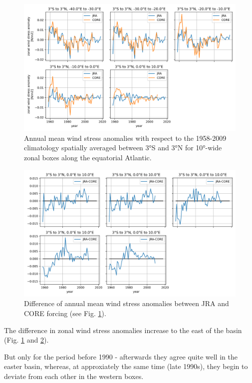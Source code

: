 \documentclass[a4paperpaper,]{article}
\begin{document}
\begin{figure}
\centering
\includegraphics{./figures/INALT20_wind_forcing_comparison/INALT_JRA_CORE_taux_anomaly_3s3n_40w10e.png}
\caption{Annual mean wind stress anomalies with respect to the 1958-2009
climatology spatially averaged between 3°S and 3°N for 10°-wide zonal
boxes along the equatorial Atlantic.\label{fig_JRA_CORE_10deg}}
\end{figure}

\begin{figure}
\centering
\includegraphics{./figures/INALT20_wind_forcing_comparison/INALT_JRA_minus_CORE_taux_anomaly_3s3n_40w10e.png}
\caption{Difference of annual mean wind stress anomalies between JRA and
CORE forcing (see Fig.
\ref{fig_JRA_CORE_10deg}).\label{fig_JRA_CORE_diff}}
\end{figure}

The difference in zonal wind stress anomalies increase to the east of
the basin (Fig. \ref{fig_JRA_CORE_10deg} and \ref{fig_JRA_CORE_diff}).

But only for the period before 1990 - afterwards they agree quite well
in the easter basin, whereas, at approxiately the same time (late
1990s), they begin to deviate from each other in the western boxes.
\end{document}
